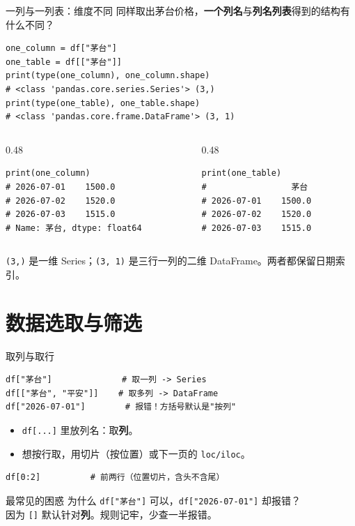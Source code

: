 \documentclass[9pt]{ctexbeamer}
\begin{document}
\begin{frame}[fragile]{一列与一列表：维度不同}
\small 同样取出茅台价格，\textbf{一个列名}与\textbf{列名列表}得到的结构有什么不同？
\begin{lstlisting}
one_column = df["茅台"]
one_table = df[["茅台"]]
print(type(one_column), one_column.shape)
# <class 'pandas.core.series.Series'> (3,)
print(type(one_table), one_table.shape)
# <class 'pandas.core.frame.DataFrame'> (3, 1)
\end{lstlisting}
\begin{columns}[T]
\begin{column}{0.48\textwidth}
\begin{lstlisting}
print(one_column)
# 2026-07-01    1500.0
# 2026-07-02    1520.0
# 2026-07-03    1515.0
# Name: 茅台, dtype: float64
\end{lstlisting}
\end{column}
\begin{column}{0.48\textwidth}
\begin{lstlisting}
print(one_table)
#                 茅台
# 2026-07-01    1500.0
# 2026-07-02    1520.0
# 2026-07-03    1515.0
\end{lstlisting}
\end{column}
\end{columns}
\texttt{(3,)} 是一维 Series；\texttt{(3, 1)} 是三行一列的二维 DataFrame。两者都保留日期索引。
\end{frame}

\section{数据选取与筛选}

\begin{frame}[fragile]{取列与取行}
	\begin{lstlisting}
df["茅台"]              # 取一列 -> Series
df[["茅台", "平安"]]    # 取多列 -> DataFrame
df["2026-07-01"]        # 报错！方括号默认是"按列"
\end{lstlisting}
	\begin{itemize}
		\item \texttt{df[...]} 里放列名：取\textbf{列}。
		\item 想按行取，用切片（按位置）或下一页的 \texttt{loc/iloc}。
	\end{itemize}
	\begin{lstlisting}
df[0:2]          # 前两行（位置切片，含头不含尾）
\end{lstlisting}
	\begin{alertblock}{最常见的困惑}
		为什么 \texttt{df["茅台"]} 可以，\texttt{df["2026-07-01"]} 却报错？\\
		因为 \texttt{[]} 默认针对\textbf{列}。规则记牢，少查一半报错。
	\end{alertblock}
\end{frame}
\end{document}
